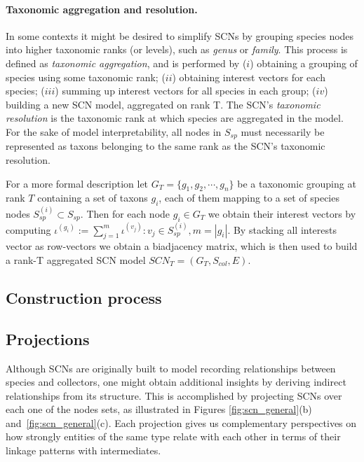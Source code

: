\paragraph{Taxonomic aggregation and resolution.}
In some contexts it might be desired to simplify SCNs by grouping species nodes into higher taxonomic ranks (or levels), such as \textit{genus} or \textit{family}. This process is defined as \textit{taxonomic aggregation}, and is performed by 
($i$) obtaining a grouping of species using some taxonomic rank; 
($ii$) obtaining interest vectors for each species; 
($iii$) summing up interest vectors for all species in each group;
($iv$) building a new SCN model, aggregated on rank T. 
The SCN's \textit{taxonomic resolution} is the taxonomic rank at which species are aggregated in the model. For the sake of model interpretability, all nodes in $S_{sp}$ must necessarily be represented as taxons belonging to the same rank as the SCN's taxonomic resolution.

For a more formal description let $G_T = \{ g_1, g_2, \cdots, g_n \}$ be a taxonomic grouping at rank $T$ containing a set of taxons $g_i$, each of them mapping to a set of species nodes $S_{sp}^{(i)} \subset S_{sp}$. Then for each node $g_i \in G_T$ we obtain their interest vectors by computing $ \iota^{(g_i)} := \sum_{j=1}^{m} \iota^{(v_j)} : v_j \in S_{sp}^{(i)}, m = |g_i|$. By stacking all interests vector as row-vectors we obtain a biadjacency matrix, which is then used to build a rank-T aggregated SCN model $SCN_T = (G_T,S_{col},E)$.



\subsection{Construction process}


\subsection{Projections}

Although SCNs are originally built to model recording relationships between species and collectors, one might obtain additional insights by deriving indirect relationships from its structure. This is accomplished by projecting SCNs over each one of the nodes sets, as illustrated in Figures \ref{fig:scn_general}(b)
and~\ref{fig:scn_general}(c). Each projection gives us complementary perspectives on how strongly entities of the same type relate with each other in terms of their linkage patterns with intermediates.


